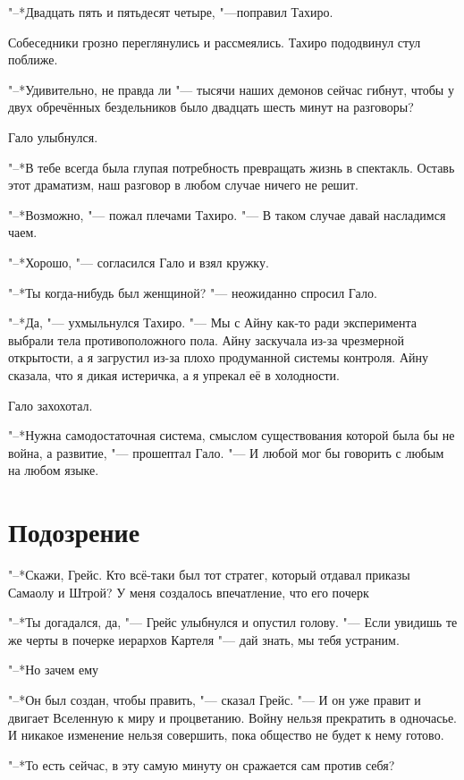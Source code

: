 "--*Двадцать пять и пятьдесят четыре, "---поправил Тахиро.

Собеседники грозно переглянулись и рассмеялись.
Тахиро пододвинул стул поближе.

"--*Удивительно, не правда ли "--- тысячи наших демонов сейчас гибнут, чтобы у двух обречённых бездельников было двадцать шесть минут на разговоры?

Гало улыбнулся.

"--*В тебе всегда была глупая потребность превращать жизнь в спектакль.
Оставь этот драматизм, наш разговор в любом случае ничего не решит.

"--*Возможно, "--- пожал плечами Тахиро.
"--- В таком случае давай насладимся чаем.

"--*Хорошо, "--- согласился Гало и взял кружку.

\spacing

"--*Ты когда-нибудь был женщиной? "--- неожиданно спросил Гало.

"--*Да, "--- ухмыльнулся Тахиро.
"--- Мы с Айну как-то ради эксперимента выбрали тела противоположного пола.
Айну заскучала из-за чрезмерной открытости, а я загрустил из-за плохо продуманной системы контроля.
Айну сказала, что я дикая истеричка, а я упрекал её в холодности.

Гало захохотал.

\spacing

"--*Нужна самодостаточная система, смыслом существования которой была бы не война, а развитие, "--- прошептал Гало.
"--- И любой мог бы говорить с любым на любом языке.

\section{Подозрение}

"--*Скажи, Грейс.
Кто всё-таки был тот стратег, который отдавал приказы Самаолу и Штрой?
У меня создалось впечатление, что его почерк\ldotst

"--*Ты догадался, да, "--- Грейс улыбнулся и опустил голову.
"--- Если увидишь те же черты в почерке иерархов Картеля "--- дай знать, мы тебя устраним.

"--*Но зачем ему\ldotsq

"--*Он был создан, чтобы править, "--- сказал Грейс.
"--- И он уже правит и двигает Вселенную к миру и процветанию.
Войну нельзя прекратить в одночасье.
И никакое изменение нельзя совершить, пока общество не будет к нему готово.

"--*То есть сейчас, в эту самую минуту он сражается сам против себя?

